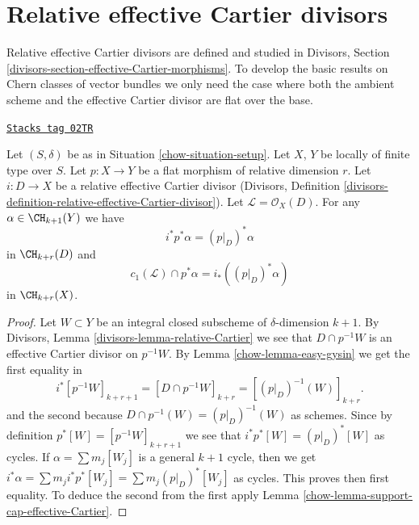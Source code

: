 \section{Relative effective Cartier divisors}
\label{chow-section-relative-effective-cartier}
Relative effective Cartier divisors are defined and studied
in Divisors, Section \ref{divisors-section-effective-Cartier-morphisms}.
To develop the basic results on Chern classes of vector bundles
we only need the case where both the ambient scheme and the effective
Cartier divisor are flat over the base.

\begin{lemma}
\label{chow-lemma-relative-effective-cartier}
\href{https://stacks.math.columbia.edu/tag/02TR}{\texttt{Stacks tag 02TR}}

Let $(S, \delta)$ be as in Situation \ref{chow-situation-setup}.
Let $X$, $Y$ be locally of finite type over $S$.
Let $p : X \to Y$ be a flat morphism of relative dimension $r$.
Let $i : D \to X$ be a relative effective Cartier divisor
(Divisors, Definition
\ref{divisors-definition-relative-effective-Cartier-divisor}).
Let $\mathcal{L} = \mathcal{O}_X(D)$.
For any $\alpha \in \CH_{k + 1}(Y)$ we have
$$
i^*p^*\alpha = (p|_D)^*\alpha
$$
in $\CH_{k + r}(D)$ and
$$
c_1(\mathcal{L}) \cap p^*\alpha = i_* ((p|_D)^*\alpha)
$$
in $\CH_{k + r}(X)$.
\end{lemma}

\begin{proof}

Let $W \subset Y$ be an integral closed subscheme of $\delta$-dimension
$k + 1$. By Divisors, Lemma \ref{divisors-lemma-relative-Cartier}
we see that $D \cap p^{-1}W$ is an effective
Cartier divisor on $p^{-1}W$. By Lemma \ref{chow-lemma-easy-gysin}
we get the first equality in
$$
i^*[p^{-1}W]_{k + r + 1} =
[D \cap p^{-1}W]_{k + r} =
[(p|_D)^{-1}(W)]_{k + r}.
$$
and the second because $D \cap p^{-1}(W) = (p|_D)^{-1}(W)$ as schemes.
Since by definition $p^*[W] = [p^{-1}W]_{k + r + 1}$ we see that
$i^*p^*[W] = (p|_D)^*[W]$ as cycles. If $\alpha = \sum m_j[W_j]$ is a
general $k + 1$ cycle, then we get
$i^*\alpha = \sum m_j i^*p^*[W_j] = \sum m_j(p|_D)^*[W_j]$ as cycles.
This proves then first equality. To deduce the second from the
first apply Lemma \ref{chow-lemma-support-cap-effective-Cartier}.
\end{proof}

